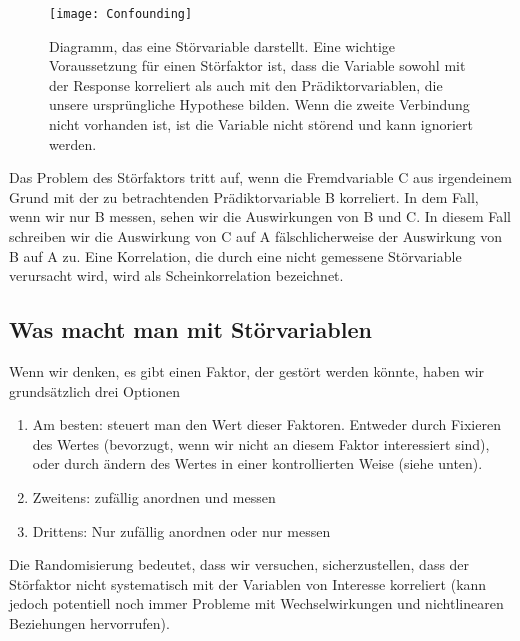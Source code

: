 \documentclass[a4paper,twoside]{tufte-book}\usepackage[]{graphicx}\usepackage[]{color}
\begin{document}
\begin{figure}[]
\begin{center}
\texttt{[image: Confounding]}
\caption{Diagramm, das eine Störvariable darstellt. Eine wichtige Voraussetzung für einen Störfaktor ist, dass die Variable sowohl mit der Response korreliert als auch mit den Prädiktorvariablen, die unsere ursprüngliche Hypothese bilden. Wenn die zweite Verbindung nicht vorhanden ist, ist die Variable nicht störend und kann ignoriert werden.}
\label{fig: Confounding}
\end{center}
\end{figure}

Das Problem des Störfaktors tritt auf, wenn die Fremdvariable C aus irgendeinem Grund mit der zu betrachtenden Prädiktorvariable B korreliert. In dem Fall, wenn wir nur B messen, sehen wir die Auswirkungen von B und C. In diesem Fall schreiben wir die Auswirkung von C auf A fälschlicherweise der Auswirkung von B auf A zu.  Eine Korrelation, die durch eine nicht gemessene Störvariable verursacht wird, wird als Scheinkorrelation bezeichnet.

\subsection{Was macht man mit Störvariablen}

Wenn wir denken, es gibt einen Faktor, der gestört werden könnte, haben wir grundsätzlich drei Optionen

\begin{enumerate}
\item Am besten: steuert man den Wert dieser Faktoren. Entweder durch Fixieren des Wertes (bevorzugt, wenn wir nicht an diesem Faktor interessiert sind), oder durch ändern des Wertes in einer kontrollierten Weise (siehe unten).
\item Zweitens: zufällig anordnen und messen
\item Drittens: Nur zufällig anordnen oder nur messen
\end{enumerate}

Die Randomisierung bedeutet, dass wir versuchen, sicherzustellen, dass der Störfaktor nicht systematisch mit der Variablen von Interesse korreliert (kann jedoch potentiell noch immer Probleme mit Wechselwirkungen und nichtlinearen Beziehungen hervorrufen).
\end{document}
